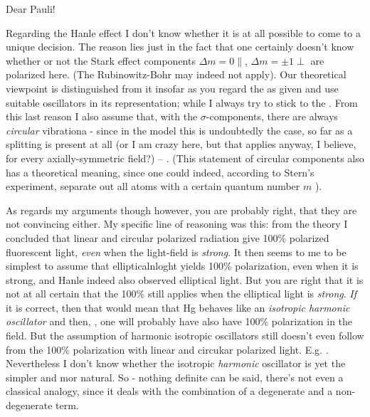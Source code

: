 \date{June 24, 1925}

Dear Pauli!

Regarding the Hanle effect I don't know whether it is at all possible to come to a unique decision. The reason lies just in the fact that one certainly doesn't know whether or not the Stark effect components $\Delta m = 0 \parallel$, $\Delta m = \pm 1 \perp$ are polarized here. (The Rubinowitz-Bohr  may indeed not apply). Our theoretical viewpoint is distinguished from it insofar as you regard the  as given and use suitable oscillators in its representation; while I always try to stick to the . From this last reason I also assume that, with the $\sigma$-components, there are always \textit{circular} vibrationa - since in the model this is undoubtedly the case, so far as a splitting is present at all (or I am crazy here, but that applies anyway, I believe, for every axially-symmetric field?) -- . (This statement of circular components also has a theoretical meaning, since one could indeed, according to Stern's experiment, separate out all atoms with a certain quantum number $m$ ).

As regards my arguments though however, you are probably right, that they are not convincing either. My specific line of reasoning was this: from the theory I concluded that  linear and circular polarized radiation give 100\% polarized fluorescent light, \textit{even} when the light-field is \textit{strong}. It then seems to me to be simplest to assume that ellipticalnloght yields 100\% polarization, even when it is strong, and Hanle indeed also observed  elliptical light. But you are right that it is not at all certain that the 100\% still applies when the elliptical light is \textit{strong}. \textit{If} it is correct, then that would mean that Hg behaves like an \textit{isotropic harmonic oscillator} and then, , one will probably have also have 100\% polarization in the field. But the assumption of harmonic isotropic oscillators still doesn't even follow from the 100\% polarization with linear and circukar polarized light. E.g. . Nevertheless I don't know whether the isotropic \textit{harmonic} oscillator is yet the simpler and mor natural. So - nothing definite can be said, there's not even a classical analogy, since it deals with the combination of a degenerate and a non-degenerate term.

